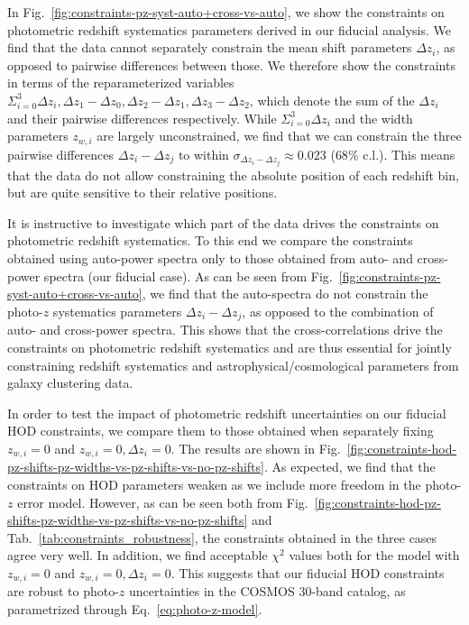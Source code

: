 \documentclass[a4paper,11pt]{article}
\begin{document}
      In Fig.~\ref{fig:constraints-pz-syst-auto+cross-vs-auto}, we show the constraints on photometric redshift systematics parameters derived in our fiducial analysis. We find that the data cannot separately constrain the mean shift parameters $\Delta z_{i}$, as opposed to pairwise differences between those. We therefore show the constraints in terms of the reparameterized variables $\Sigma_{i=0}^{3} \Delta z_{i}, \Delta z_{1} - \Delta z_{0}, \Delta z_{2} - \Delta z_{1}, \Delta z_{3} - \Delta z_{2}$, which denote the sum of the $\Delta z_{i}$ and their pairwise differences respectively. While $\Sigma_{i=0}^{3} \Delta z_{i}$ and the width parameters $z_{w, i}$ are largely unconstrained, we find that we can constrain the three pairwise differences $\Delta z_{i} - \Delta z_{j}$ to within $\sigma_{\Delta z_{i} - \Delta z_{j}} \approx 0.023$ ($68 \%$ c.l.). This means that the data do not allow constraining the absolute position of each redshift bin, but are quite sensitive to their relative positions.

      It is instructive to investigate which part of the data drives the constraints on photometric redshift systematics. To this end we compare the constraints obtained using auto-power spectra only to those obtained from auto- and cross-power spectra (our fiducial case). As can be seen from Fig.~\ref{fig:constraints-pz-syst-auto+cross-vs-auto}, we find that the auto-spectra do not constrain the photo-$z$ systematics parameters $\Delta z_{i} - \Delta z_{j}$, as opposed to the combination of auto- and cross-power spectra. This shows that the cross-correlations drive the constraints on photometric redshift systematics and are thus essential for jointly constraining redshift systematics and astrophysical/cosmological parameters from galaxy clustering data.

      In order to test the impact of photometric redshift uncertainties on our fiducial HOD constraints, we compare them to those obtained when separately fixing $z_{w, i} = 0$ and $z_{w, i} = 0, \Delta z_{i} = 0$. The results are shown in Fig.~\ref{fig:constraints-hod-pz-shifts-pz-widths-vs-pz-shifts-vs-no-pz-shifts}. As expected, we find that the constraints on HOD parameters weaken as we include more freedom in the photo-$z$ error model. However, as can be seen both from Fig.~\ref{fig:constraints-hod-pz-shifts-pz-widths-vs-pz-shifts-vs-no-pz-shifts} and Tab.~\ref{tab:constraints_robustness}, the constraints obtained in the three cases agree very well. In addition, we find acceptable $\chi^{2}$ values both for the model with $z_{w, i} = 0$ and $z_{w, i} = 0, \Delta z_{i} = 0$. This suggests that our fiducial HOD constraints are robust to photo-$z$ uncertainties in the COSMOS 30-band catalog, as parametrized through Eq.~\ref{eq:photo-z-model}. 
\end{document}
